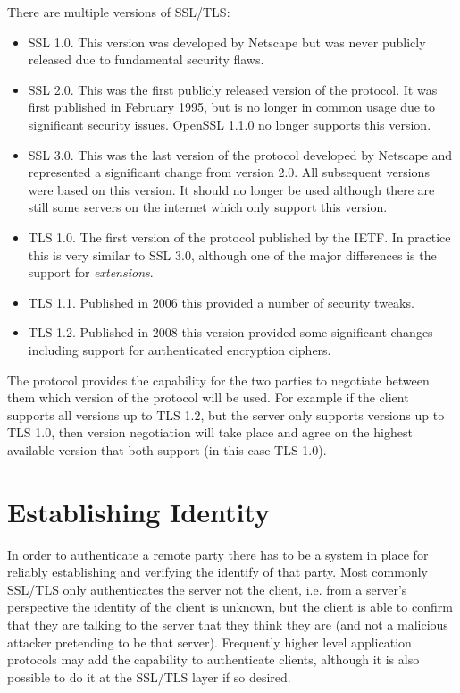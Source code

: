 There are multiple versions of SSL/TLS:
\begin{itemize}
\item SSL 1.0. This version was developed by Netscape but was never publicly 
released due to fundamental security flaws.
\item SSL 2.0. This was the first publicly released version of the protocol. It 
was first published in February 1995, but is no longer in common usage due to 
significant security issues. OpenSSL 1.1.0 no longer supports this version.
\item SSL 3.0. This was the last version of the protocol developed by Netscape 
and represented a significant change from version 2.0. All subsequent versions 
were based on this version. It should no longer be used although there are 
still some servers on the internet which only support this version.
\item TLS 1.0. The first version of the protocol published by the IETF. In 
practice this is very similar to SSL 3.0, although one of the major differences 
is the support for \emph{extensions}.
\item TLS 1.1. Published in 2006 this provided a number of security tweaks.
\item TLS 1.2. Published in 2008 this version provided some significant changes
including  support for authenticated encryption ciphers.
\end{itemize}

The protocol provides the capability for the two parties to negotiate between 
them which version of the protocol will be used. For example if the client 
supports all versions up to TLS 1.2, but the server only supports versions up 
to TLS 1.0, then version negotiation will take place and agree on the highest 
available version that both support (in this case TLS 1.0).

\section{Establishing Identity}

In order to authenticate a remote party there has to be a system in place for 
reliably establishing and verifying the identify of that party. Most commonly 
SSL/TLS only authenticates the server not the client, i.e. from a server's 
perspective the identity of the client is unknown, but the client is able to 
confirm that they are talking to the server that they think they are (and not a 
malicious attacker pretending to be that server). Frequently higher level 
application protocols may add the capability to authenticate clients, although
it is also possible to do it at the SSL/TLS layer if so desired.

